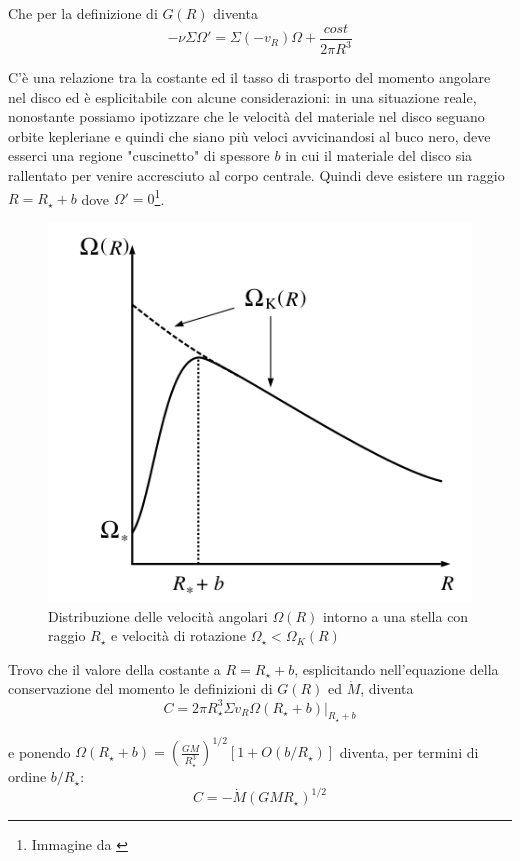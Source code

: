 \documentclass[a4paperbi]{article}
\begin{document}
	Che per la definizione di $G(R)$ diventa
	\begin{equation}
		-\nu\Sigma\Omega'=\Sigma(-v_R)\Omega+\frac{cost}{2\pi R^3}
	\end{equation}
	
	C'è una relazione tra la costante ed il tasso di trasporto del momento angolare nel disco ed è esplicitabile con alcune considerazioni: in una situazione reale, nonostante possiamo ipotizzare che le velocità del materiale nel disco seguano orbite kepleriane e quindi che siano più veloci avvicinandosi al buco nero, deve esserci una regione "cuscinetto" di spessore $b$ in cui il materiale del disco sia rallentato per venire accresciuto al corpo centrale. Quindi deve esistere un raggio $R=R_{\star}+b$ dove $\Omega'=0$\footnote{Immagine da \cite{FrankKingRaineAccretionPower}}.
	
	\begin{figure}[H]
		\centering
		\includegraphics[width=0.7\linewidth]{InnerRegionAngularVelocity}
		\caption{Distribuzione delle velocità angolari $\Omega(R)$ intorno a una stella con raggio $R_\star$ e velocità di rotazione $\Omega_{\star}<\Omega_K(R)$}
		\label{fig:InnerRegionAngularVelocity}
	\end{figure}

	Trovo che il valore della costante a $R=R_{\star}+b$, esplicitando nell'equazione della conservazione del momento le definizioni di $G(R)$ ed $\dot{M}$, diventa
	\begin{equation*}
		C=2\pi R_{\star}^3\Sigma v_R\Omega(R_{\star}+b)\vert_{R_{\star}+b}
	\end{equation*}
	
	e ponendo $\Omega(R_{\star}+b)=\left(\frac{GM}{R_{\star}^3}\right)^{1/2}[1+O(b/R_{\star})]$ diventa, per termini di ordine $b/R_{\star}$:
	\begin{equation}
		C=-\dot{M}(GMR_{\star})^{1/2}
	\end{equation}	
\end{document}
